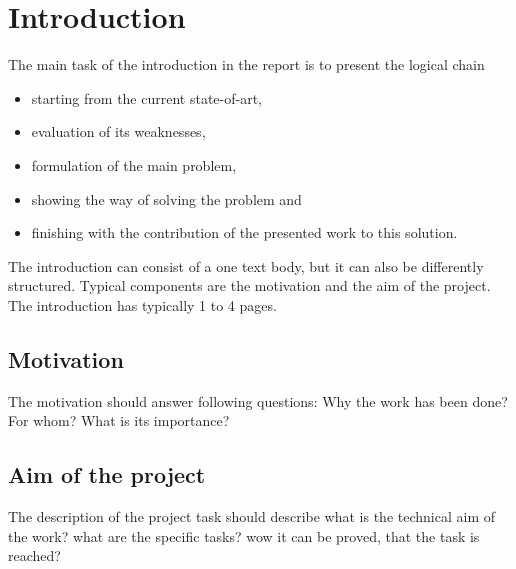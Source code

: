\chapter{Introduction}
\label{chap1}


The main task of the introduction in the report is to present the
logical chain

\begin{itemize}

\item starting from the current state-of-art,

\item evaluation of its weaknesses,

\item formulation of the main problem,

\item showing the way of solving the problem and

\item finishing with the contribution of the presented work to this solution.

\end{itemize}


The introduction can consist of a one text body, but it can also be
differently structured. Typical components are the motivation and
the aim of the project. The introduction has typically 1 to 4 pages.


\section{Motivation}
\label{s:Motivation}

The motivation should answer following questions:
Why the work has been done? For whom? What is its importance?


\section{Aim of the project}
\label{s:aim}

The description of the project task should describe
what is the technical aim of the work? what are the specific
tasks? wow it can be proved, that the task is reached?  \\
